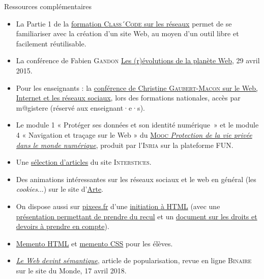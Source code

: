 \begin{gofurther}{Ressources complémentaires}
\begin{itemize}\jazzitem
\item La Partie 1 de la \href{https://pixees.fr/classcode/formations/module4/\#partie1}{formation \textsc{Class´Code} sur les réseaux} permet de se familiariser avec la création d'un site Web, au moyen d'un outil libre et facilement réutilisable.
\item La conférence de Fabien \textsc{Gandon} \href{http://www.mshsud.tv/spip.php?article632}{Les (r)évolutions de la planète Web}, 29 avril 2015.
\item Pour les enseignants : la \href{https://magistere.education.fr/dgesco/}{conférence de Christine \textsc{Gaubert-Macon} sur le Web, Internet et les réseaux sociaux}, lors des formations nationales, accès par m@gistere (réservé aux enseignant·e·s).
\item Le module 1 « Protéger ses données et son identité numérique~» et le module 4 « Navigation et traçage sur le Web » du \href{https://www.fun-mooc.fr/courses/course-v1:inria+41015+session03/about}{\textsc{Mooc} \textit{Protection de la vie privée dans le monde numérique}}, produit par l'\textsc{Inria} sur la plateforme FUN.
\item Une \href{https://interstices.info/dossier/snt-web/}{sélection d'articles} du site \textsc{Interstices}.
\end{itemize}

\vspace{2pt}
\begin{itemize}\jazzitem
\item Des animations intéressantes sur les réseaux sociaux et le web en général (les \textit{cookies}...) sur le site d'\href{https://donottrack-doc.com/fr/episodes/}{Arte}.
\item On dispose aussi sur \url{pixees.fr} d'une \href{https://pixees.fr/decouvrir-le-html/}{initiation à HTML} (avec une \href{https://pixees.fr/les-dessous-de-html-css-js-en-deux-idees-simples/}{présentation permettant de prendre du recul} et un \href{https://pixees.fr/quels-sont-les-droits-et-les-devoirs-des-webmestres/}{document sur les droits et devoirs à prendre en compte}).
\item \href{./Documents/Chapter09/memento_xhtml.pdf}{Memento HTML} et \href{./Documents/Chapter09/memento_css3.pdf}{memento CSS} pour les élèves.
\item \href{https://www.lemonde.fr/blog/binaire/2018/04/17/et-le-web-devint-semantique/}{\textit{Le Web devint sémantique}}, article de popularisation, revue en ligne \textsc{Binaire} sur le site du Monde, 17 avril 2018.
\end{itemize}
\end{gofurther}


